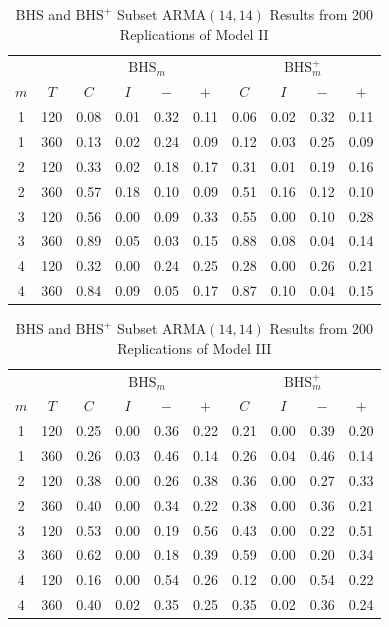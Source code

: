 \begin{table}[htbp]
\footnotesize
\centering
\caption{BHS and $\textrm{BHS}^+$ Subset ARMA$(14,14)$ Results from 200 Replications of Model II}
\begin{tabular}{cc|cccc|cccc}
  \hline
  & & \multicolumn{4}{c|}{$\textrm{BHS}_m$} & \multicolumn{4}{c}{$\textrm{BHS}^+_m$} \\
  \cline{4-5}  \cline{8-9}
  $m$ & $T$ & $C$ & $I$ & $-$ & $+$ & $C$ & $I$ & $-$ & $+$ \\
  \hline
  1 & 120 & 0.08 & 0.01 & 0.32 & 0.11 & 0.06 & 0.02 & 0.32 & 0.11 \\ 
  1 & 360 & 0.13 & 0.02 & 0.24 & 0.09 & 0.12 & 0.03 & 0.25 & 0.09 \\ 
  2 & 120 & 0.33 & 0.02 & 0.18 & 0.17 & 0.31 & 0.01 & 0.19 & 0.16 \\ 
  2 & 360 & 0.57 & 0.18 & 0.10 & 0.09 & 0.51 & 0.16 & 0.12 & 0.10 \\ 
  3 & 120 & 0.56 & 0.00 & 0.09 & 0.33 & 0.55 & 0.00 & 0.10 & 0.28 \\ 
  3 & 360 & 0.89 & 0.05 & 0.03 & 0.15 & 0.88 & 0.08 & 0.04 & 0.14 \\ 
  \hline
  4 & 120 & 0.32 & 0.00 & 0.24 & 0.25 & 0.28 & 0.00 & 0.26 & 0.21 \\ 
  4 & 360 & 0.84 & 0.09 & 0.05 & 0.17 & 0.87 & 0.10 & 0.04 & 0.15 \\ 
   \hline
\end{tabular}
\label{tab:hshspmod2}
\end{table}




\begin{table}[htbp]
\footnotesize
\centering
\caption{BHS and $\textrm{BHS}^+$ Subset ARMA$(14,14)$ Results from 200 Replications of Model III}
\begin{tabular}{cc|cccc|cccc}
  \hline
    & & \multicolumn{4}{c|}{$\textrm{BHS}_m$} & \multicolumn{4}{c}{$\textrm{BHS}^+_m$} \\
  \cline{4-5}  \cline{8-9}
  $m$ & $T$ & $C$ & $I$ & $-$ & $+$ & $C$ & $I$ & $-$ & $+$ \\
  \hline
  1 & 120 & 0.25 & 0.00 & 0.36 & 0.22 & 0.21 & 0.00 & 0.39 & 0.20 \\ 
  1 & 360 & 0.26 & 0.03 & 0.46 & 0.14 & 0.26 & 0.04 & 0.46 & 0.14 \\ 
  2 & 120 & 0.38 & 0.00 & 0.26 & 0.38 & 0.36 & 0.00 & 0.27 & 0.33 \\ 
  2 & 360 & 0.40 & 0.00 & 0.34 & 0.22 & 0.38 & 0.00 & 0.36 & 0.21 \\ 
  3 & 120 & 0.53 & 0.00 & 0.19 & 0.56 & 0.43 & 0.00 & 0.22 & 0.51 \\ 
  3 & 360 & 0.62 & 0.00 & 0.18 & 0.39 & 0.59 & 0.00 & 0.20 & 0.34 \\ 
  \hline
  4 & 120 & 0.16 & 0.00 & 0.54 & 0.26 & 0.12 & 0.00 & 0.54 & 0.22 \\ 
  4 & 360 & 0.40 & 0.02 & 0.35 & 0.25 & 0.35 & 0.02 & 0.36 & 0.24 \\ 
   \hline
\end{tabular}
\label{tab:hshspmod3}
\end{table}

